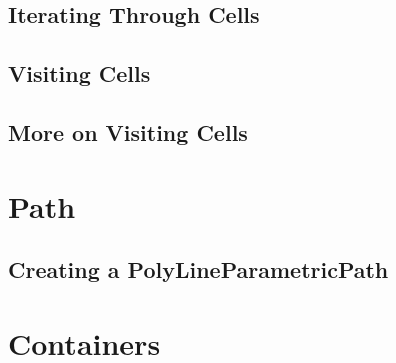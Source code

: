 \subsection{Iterating Through Cells}
\label{sec:MeshCellsIteration}




\subsection{Visiting Cells}
\label{sec:MeshCellVisitor}




\subsection{More on Visiting Cells}
\label{sec:MeshCellVisitorMultipleType}




\section{Path}\label{PathSection}

\subsection{Creating a PolyLineParametricPath}
\label{sec:CreatingAPolyLineParametricPath}



\section{Containers}\label{ContainersSection}
\label{sec:TreeContainer}

